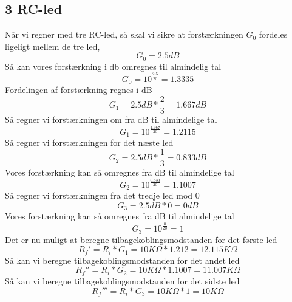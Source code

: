 \subsection{3 RC-led}
%
Når vi regner med tre RC-led, så skal vi sikre at forstærkningen $G_{0}$ fordeles ligeligt mellem de tre led, 
%
\begin{equation}
	G_0 = 2.5dB
\end{equation}
\noindent
%
Så kan vores forstærkning i db omregnes til almindelig tal
%
\begin{equation}
	G_0 = 10^{\frac{2.5}{20}} = 1.3335
\end{equation}
\noindent
%
Fordelingen af forstærkning regnes i dB
%
\begin{equation}
	G_1 = 2.5dB*\frac{2}{3} = 1.667dB
\end{equation}
\noindent
%
Så regner vi forstærkningen om fra dB til almindelige tal
%
\begin{equation}
	G_1 = 10^{\frac{1.667}{20}} = 1.2115
\end{equation}
\noindent
%
Så regner vi forstærkningen for det næste led
%
\begin{equation}
	G_2 = 2.5dB*\frac{1}{3} = 0.833dB
\end{equation}
\noindent
%
Vores forstærkning kan så omregnes fra dB til almindelige tal
%
\begin{equation}
	G_2 = 10^{\frac{0.833}{20}} = 1.1007
\end{equation}
\noindent
%
Så regner vi forstærkningen fra det tredje led mod 0
%
\begin{equation}
	G_3 = 2.5dB*0 = 0dB
\end{equation}
\noindent
%
Vores forstærkning kan så omregnes fra dB til almindelige tal
%
\begin{equation}
	G_3 = 10^{\frac{0}{20}} = 1
\end{equation}
\noindent
%
Det er nu muligt at beregne tilbagekoblingsmodstanden for det første led
%
\begin{equation}
	R_f' = R_i*G_1 = 10K\Omega*1.212 = 12.115K\Omega
\end{equation}
\noindent
%
Så kan vi beregne tilbagekoblingsmodstanden for det andet led
%
\begin{equation}
	R_f'' = R_i*G_2 = 10K\Omega*1.1007 = 11.007K\Omega
\end{equation}
\noindent
%
Så kan vi beregne tilbagekoblingsmodstanden for det sidste led
%
\begin{equation}
	R_f''' = R_i*G_3 = 10K\Omega*1 = 10K\Omega
\end{equation}
